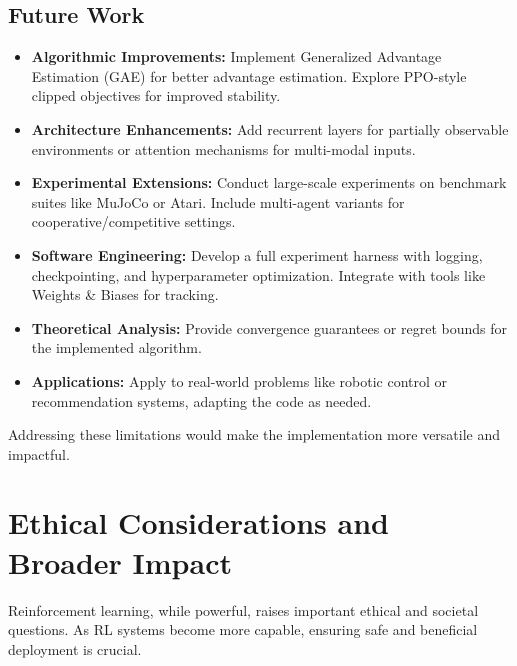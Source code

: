 \documentclass[11pt]{article}
\begin{document}
\subsection{Future Work}
\begin{itemize}
  \item \textbf{Algorithmic Improvements:} Implement Generalized Advantage Estimation (GAE) for better advantage estimation. Explore PPO-style clipped objectives for improved stability.
  \item \textbf{Architecture Enhancements:} Add recurrent layers for partially observable environments or attention mechanisms for multi-modal inputs.
  \item \textbf{Experimental Extensions:} Conduct large-scale experiments on benchmark suites like MuJoCo or Atari. Include multi-agent variants for cooperative/competitive settings.
  \item \textbf{Software Engineering:} Develop a full experiment harness with logging, checkpointing, and hyperparameter optimization. Integrate with tools like Weights \& Biases for tracking.
  \item \textbf{Theoretical Analysis:} Provide convergence guarantees or regret bounds for the implemented algorithm.
  \item \textbf{Applications:} Apply to real-world problems like robotic control or recommendation systems, adapting the code as needed.
\end{itemize}

Addressing these limitations would make the implementation more versatile and impactful.

\section{Ethical Considerations and Broader Impact}
Reinforcement learning, while powerful, raises important ethical and societal questions. As RL systems become more capable, ensuring safe and beneficial deployment is crucial.
\end{document}
